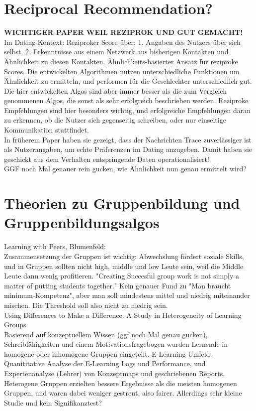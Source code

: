 \documentclass[nochapterpage,bigchapter,linedtoc,longdoc,colorback,accentcolor=tud3b,oneside]{tudreport}
\begin{document}
\section{Reciprocal Recommendation?}

\textbf{WICHTIGER PAPER WEIL REZIPROK UND GUT GEMACHT!}\\
Im Dating-Kontext: Reziproker Score über: 1. Angaben des Nutzers über sich selbst, 2. Erkenntnisse aus einem Netzwerk aus bisherigen Kontakten und Ähnlichkeit zu diesen Kontakten. Ähnlichkeits-basierter Ansatz für reziproke Scores. Die entwickelten Algorithmen nutzen unterschiedliche Funktionen um Ähnlichkeit zu ermitteln, und performen für die Geschlechter unterschiedlich gut. Die hier entwickelten Algos sind aber immer besser als die zum Vergleich genommenen Algos, die sonst als sehr erfolgreich beschrieben werden. Reziproke Empfehlungen sind hier besonders wichtig, und erfolgreiche Empfehlungen daran zu erkennen, ob die Nutzer sich gegenseitig schreiben, oder nur einseitige Kommunikation stattfindet. \cite{xia2015reciprocal} \\
In früherem Paper haben sie gezeigt, dass der Nachrichten Trace zuverlässiger ist als Nutzerangaben, um echte Präferenzen im Dating anzugeben. Damit haben sie geschickt aus dem Verhalten entspringende Daten operationalisiert! \cite{xia2014characterization}\\
GGF noch Mal genauer rein gucken, wie Ähnlichkeit nun genau ermittelt wird?\\

\section{Theorien zu Gruppenbildung und Gruppenbildungsalgos}
Learning with Peers, Blumenfeld: \cite{blumenfeld1996learning}\\
Zusammensetzung der Gruppen ist wichtig: Abwechslung fördert soziale Skills, und in Gruppen sollten nicht high, middle und low Leute sein, weil die Middle Leute dann wenig profitieren. "Creating Succesful group work is not simply a matter of putting students together." Kein genauer Fund zu "Man braucht minimum-Kompetenz", aber man soll mindestens mittel und niedrig miteinander mischen. Die Threshold soll also nicht zu niedrig sein.\\

Using Differences to Make a Difference: A Study in Heterogeneity of Learning Groups \cite{manske2015using}\\
Basierend auf konzeptuellem Wissen (ggf noch Mal genau gucken), Schreibfähigkeiten und einem Motivationsfragebogen wurden Lernende in homogene oder inhomogene Gruppen eingeteilt. E-Learning Umfeld. Quanititative Analyse der E-Learning Logs und Performance, und Expertenanalyse (Lehrer) von Konzeptmaps und geschriebenen Reports. Heterogene Gruppen erzielten bessere Ergebnisse als die meisten homogenen Gruppen, und waren dabei weniger gestreut, also fairer. Allerdings sehr kleine Studie und kein Signifikanztest?\\
\\
\end{document}
